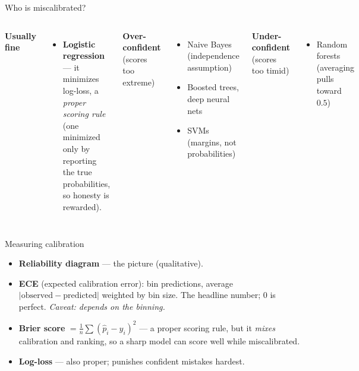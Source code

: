 \documentclass[aspectratio=169]{beamer}
\begin{document}
\begin{frame}{Who is miscalibrated?}
  \begin{columns}[T]
    \textbf{Usually fine}
    \begin{itemize}\small
      \item \textbf{Logistic regression} --- it minimizes log-loss, a \emph{proper scoring rule}
        (one minimized only by reporting the true probabilities, so honesty is rewarded).
    \end{itemize}
    \vskip 2pt
    \textbf{Over-confident} (scores too extreme)
    \begin{itemize}\small
      \item Naive Bayes (independence assumption)
      \item Boosted trees, deep neural nets
      \item SVMs (margins, not probabilities)
    \end{itemize}
    \textbf{Under-confident} (scores too timid)
    \begin{itemize}\small
      \item Random forests (averaging pulls toward $0.5$)
    \end{itemize}
    \vskip 6pt
  \end{columns}
\end{frame}

\begin{frame}{Measuring calibration}
  \begin{itemize}
    \item \textbf{Reliability diagram} --- the picture (qualitative).
    \item \textbf{ECE} (expected calibration error): bin predictions, average
      $|\text{observed} - \text{predicted}|$ weighted by bin size. The headline number; $0$ is
      perfect. \emph{Caveat: depends on the binning.}
    \item \textbf{Brier score} $=\tfrac1n\sum(\hat p_i - y_i)^2$ --- a proper scoring rule, but
      it \emph{mixes} calibration and ranking, so a sharp model can score well while miscalibrated.
    \item \textbf{Log-loss} --- also proper; punishes confident mistakes hardest.
  \end{itemize}
  \vfill
\end{frame}
\end{document}
